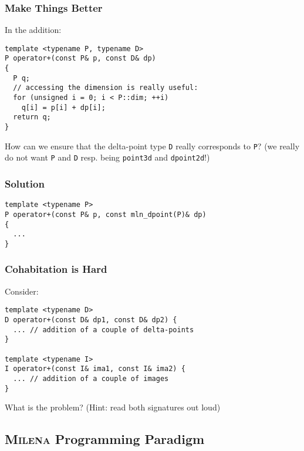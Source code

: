\documentclass{beamer}
\newcommand{\code}[1]{{\scriptsize{\texttt{#1}}}\xspace}
\newcommand{\mln}{\textsc{Milena}\xspace}
\begin{document}
\begin{frame}[fragile]
  \frametitle{Make Things Better}

In the addition:

\begin{lstlisting}
template <typename P, typename D>
P operator+(const P& p, const D& dp)
{
  P q;
  // accessing the dimension is really useful:
  for (unsigned i = 0; i < P::dim; ++i)
    q[i] = p[i] + dp[i];
  return q;
}
\end{lstlisting}

How can we ensure that the delta-point type \code{D} really corresponds
to \code{P}?  {\scriptsize (we really do not want \code{P} and
  \code{D} resp. being \code{point3d} and \code{dpoint2d}!)}

\end{frame}


\begin{frame}[fragile]
  \frametitle{Solution}

\begin{lstlisting}
template <typename P>
P operator+(const P& p, const mln_dpoint(P)& dp)
{
  ...
}
\end{lstlisting}

\end{frame}



\begin{frame}[fragile]
  \frametitle{Cohabitation is Hard}

Consider:

\begin{lstlisting}
template <typename D>
D operator+(const D& dp1, const D& dp2) {
  ... // addition of a couple of delta-points
}

template <typename I>
I operator+(const I& ima1, const I& ima2) {
  ... // addition of a couple of images
}
\end{lstlisting}

What is the problem?  (Hint: read both signatures out loud)

\end{frame}



\subsection{\mln Programming Paradigm}
\end{document}
